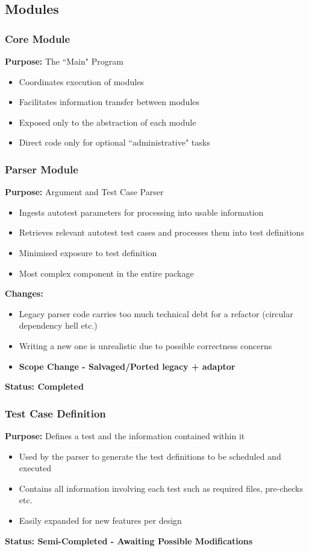 \documentclass[xcolor]{beamer}
\begin{document}
\subsection{Modules}
\begin{frame}
	\frametitle{Core Module}
	\textbf{Purpose:} The ``Main" Program\\
	\begin{itemize}
		\item Coordinates execution of modules
		\pause
		\item Facilitates information transfer between modules
		\pause
		\item Exposed only to the abstraction of each module
		\pause
		\item Direct code only for optional ``administrative" tasks
	\end{itemize}
\end{frame}

\begin{frame}
	\frametitle{Parser Module}
	\textbf{Purpose:} Argument and Test Case Parser\\
	\begin{itemize}
		\item Ingests autotest parameters for processing into usable information
		\pause
		\item Retrieves relevant autotest test cases and processes them into test definitions
		\pause
		\item Minimised exposure to test definition
		\pause
		\item Most complex component in the entire package
		\pause
	\end{itemize}
	\textbf{Changes:}
	\begin{itemize}
		\item Legacy parser code carries too much technical debt for a refactor (circular dependency hell etc.)
		\pause
		\item Writing a new one is unrealistic due to possible correctness concerns
		\pause
		\item \textbf{Scope Change - Salvaged/Ported legacy + adaptor}
		\pause
	\end{itemize}
	\textbf{Status: Completed}
\end{frame}

\begin{frame}
	\frametitle{Test Case Definition}
	\textbf{Purpose:} Defines a test and the information contained within it\\
	\begin{itemize}
		\item Used by the parser to generate the test definitions to be scheduled and executed
		\pause
		\item Contains all information involving each test such as required files, pre-checks etc.
		\pause
		\item Easily expanded for new features per design
		\pause
	\end{itemize}
	\textbf{Status: Semi-Completed - Awaiting Possible Modifications}
\end{frame}
\end{document}

